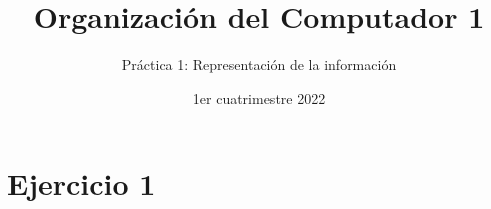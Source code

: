 

\title{Organización del Computador 1}
\author{Práctica 1: Representación de la información}
\date{1er cuatrimestre 2022}



\maketitle
\tableofcontents
\newpage

\section{Ejercicio 1}

\subsection{}

